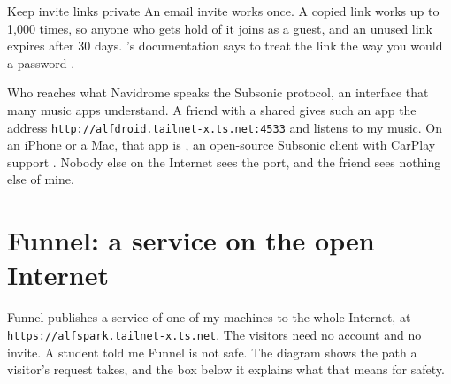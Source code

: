 \documentclass[11pt,a4paper]{article}
\begin{document}
\begin{insight}{Keep invite links private}
An email invite works once. A copied link works up to 1,000 times, so anyone who gets hold of it joins as a guest, and an unused link expires after 30 days. 's documentation says to treat the link the way you would a password \cite{tssharing}.
\end{insight}

\begin{result}{Who reaches what}
Navidrome speaks the Subsonic protocol, an interface that many music apps understand. A friend with a shared  gives such an app the address \texttt{http://alfdroid.tailnet-x.ts.net:4533} and listens to my music. On an iPhone or a Mac, that app is , an open-source Subsonic client with CarPlay support \cite{navapps}. Nobody else on the Internet sees the port, and the friend sees nothing else of mine.
\end{result}

\section{Funnel: a service on the open Internet}

 Funnel publishes a service of one of my machines to the whole Internet, at \texttt{https://alfspark.tailnet-x.ts.net}. The visitors need no  account and no invite. A student told me Funnel is not safe. The diagram shows the path a visitor's request takes, and the box below it explains what that means for safety.

\begin{center}
\end{center}
\end{document}
